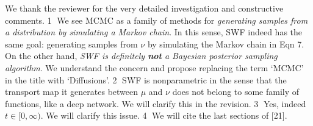 \documentclass{article}
\newcommand{\rev}[1]{{\color{red} #1}}
\newcommand{\alain}[1]{{\color{cyan} #1}}
\newcommand{\ubul}[1]{{\large \color{red} \textcircled{\small #1}}}
\begin{document}
%
We thank the reviewer for the very detailed investigation and constructive comments. %
%
%
\ubul{1} We see MCMC as a family of methods for \emph{generating samples from a distribution by simulating a Markov chain}. In this sense, SWF indeed has the same goal: generating samples from $\nu$ by simulating the Markov chain in Eqn 7. On the other hand, \emph{SWF is definitely \textbf{not} a Bayesian posterior sampling algorithm}. We understand the concern and propose replacing the term `MCMC' in the title with `Diffusions'.
%
%
\ubul{2} SWF is nonparametric in the sense that the transport map it generates between $\mu$ and $\nu$ does not belong to some family of functions, like a deep network. 
We will clarify this in the revision.
%
%
\ubul{3} Yes, indeed $t \in [0, \infty)$. We will clarify this issue.
%
%
\ubul{4} We will cite the last sections of [21]. %
%
%
\end{document}
